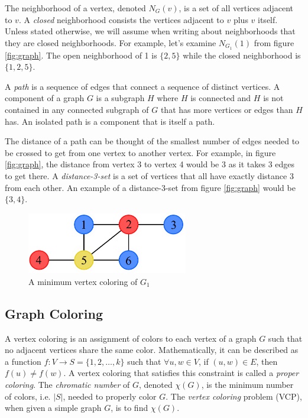 \documentclass{sig-alternate}
\begin{document}
The neighborhood of a vertex, denoted $N_G(v)$, is a set of all vertices adjacent to $v$. A \emph{closed} neighborhood consists the vertices adjacent to $v$ plus $v$ itself. Unless stated otherwise, we will assume when writing about neighborhoods that they are closed neighborhoods. For example, let's examine $N_{G_1}(1)$ from figure  \ref{fig:graph}. The open neighborhood of 1 is $\{2, 5\}$ while the closed neighborhood is $\{1, 2, 5\}$.

A \emph{path} is a sequence of edges that connect a sequence of distinct vertices. A component of a graph $G$ is a subgraph $H$ where $H$ is connected and $H$ is not contained in any connected subgraph of $G$ that has more vertices or edges than $H$ has. An isolated path is a component that is itself a path.

The distance of a path can be thought of the smallest number of edges needed to be crossed to get from one vertex to another vertex. For example, in figure \ref{fig:graph}, the distance from vertex 3 to vertex 4 would be 3 as it takes 3 edges to get there. A \emph{distance-3-set} is a set of vertices that all have exactly distance 3 from each other. An example of a distance-3-set from figure \ref{fig:graph} would be $\{3,4\}$. \cite{bondy1976graph,west2001introduction}

\begin{figure}[h]
	\centering
	\includegraphics[width=7cm]{../figures/example-vcp.pdf}
	\caption{A minimum vertex coloring of $G_1$}\label{fig:vcp-example}
\end{figure}

\subsection{Graph Coloring}
\label{sec:coloring}
A vertex coloring is an assignment of colors to each vertex of a graph $G$ such that no adjacent vertices share the same color. Mathematically, it can be described as a function $f : V \rightarrow S = \{1, 2, \dots, k\}$ such that $\forall u,w \in V$, if $(u,w) \in E$, then $f(u) \neq f(w)$. A vertex coloring that satisfies this constraint is called a \emph{proper coloring}. The \emph{chromatic number} of $G$, denoted $\chi(G)$, is the minimum number of colors, i.e. $|S|$, needed to properly color $G$. The \emph{vertex coloring} problem (VCP), when given a simple graph $G$, is to find $\chi(G)$. \cite{bondy1976graph}
\end{document}
